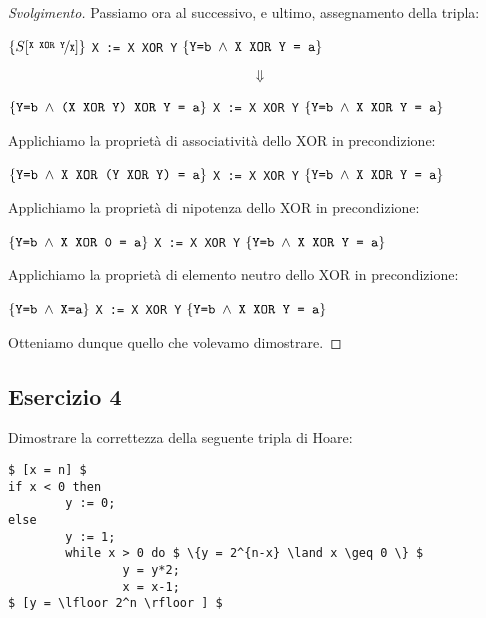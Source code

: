 \begin{proof}[Svolgimento]
Passiamo ora al successivo, e ultimo, assegnamento della tripla:
\begin{center}
$ \{ S[\nicefrac{\text{\texttt{X XOR Y}}}{\text{\texttt{X}}} ] \} $
\texttt{X := X XOR Y}
$ \{ \text{\texttt{Y=b}} \; \land \; \text{\texttt{X XOR Y = a}} \} $
\end{center}
\[ \Downarrow \]
\begin{center}
$ \{ \text{\texttt{Y=b}} \; \land \; \text{\texttt{(X XOR Y) XOR Y = a}} \} $
\texttt{X := X XOR Y}
$ \{ \text{\texttt{Y=b}} \; \land \; \text{\texttt{X XOR Y = a}} \} $
\end{center}
Applichiamo la proprietà di associatività dello XOR in precondizione:
\begin{center}
$ \{ \text{\texttt{Y=b}} \; \land \; \text{\texttt{X XOR (Y XOR Y) = a}} \} $
\texttt{X := X XOR Y}
$ \{ \text{\texttt{Y=b}} \; \land \; \text{\texttt{X XOR Y = a}} \} $
\end{center}
Applichiamo la proprietà di nipotenza dello XOR in precondizione:
\begin{center}
$ \{ \text{\texttt{Y=b}} \; \land \; \text{\texttt{X XOR 0 = a}} \} $
\texttt{X := X XOR Y}
$ \{ \text{\texttt{Y=b}} \; \land \; \text{\texttt{X XOR Y = a}} \} $
\end{center}
Applichiamo la proprietà di elemento neutro dello XOR in precondizione:
\begin{center}
$ \{ \text{\texttt{Y=b}} \; \land \; \text{\texttt{X=a}} \} $
\texttt{X := X XOR Y}
$ \{ \text{\texttt{Y=b}} \; \land \; \text{\texttt{X XOR Y = a}} \} $
\end{center}
Otteniamo dunque quello che volevamo dimostrare.
\end{proof}


\subsection{Esercizio 4}

Dimostrare la correttezza della seguente tripla di Hoare:
\begin{lstlisting}[mathescape, numberfirstline=false, frame=single]
$ [x = n] $
if x < 0 then
        y := 0;
else
        y := 1;
        while x > 0 do $ \{y = 2^{n-x} \land x \geq 0 \} $
                y = y*2;
                x = x-1;
$ [y = \lfloor 2^n \rfloor ] $
\end{lstlisting}

